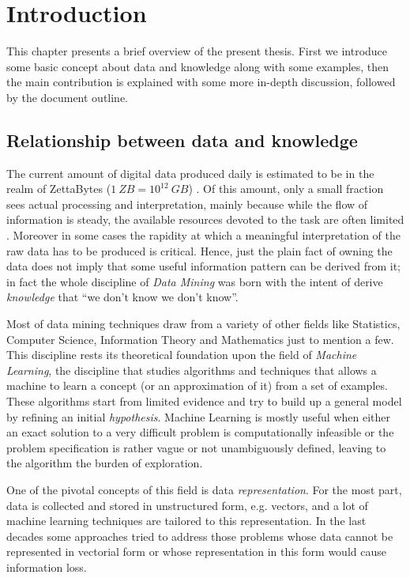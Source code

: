 
\chapter{Introduction} %
\label{Chapter1} %

This chapter presents a brief overview of the present thesis.
First we introduce some basic concept about data and knowledge along with some examples,
then the main contribution is explained with some more in-depth discussion,
followed by the document outline.

\section{Relationship between data and knowledge}

The current amount of digital data produced daily is estimated to be in the realm of 
ZettaBytes ($1~ZB = 10^{12}~GB$) \cite{idc}.
Of this amount, only a small fraction sees actual processing and interpretation,
mainly because while the flow of information is steady, the available resources
devoted to the task are often limited \cite{idc}.
Moreover in some cases the rapidity at which a meaningful interpretation of the 
raw data has to be produced is critical.
Hence, just the plain fact of owning the data does not imply that some useful 
information pattern can be derived from it; in fact the whole discipline of \emph{Data Mining}
was born with the intent of derive \emph{knowledge} that ``we don't know we don't know''.

Most of data mining techniques draw from a variety of other fields like Statistics,
Computer Science, Information Theory and Mathematics just to mention a few.
This discipline rests its theoretical foundation upon the field of \emph{Machine Learning},
the discipline that studies algorithms and techniques that allows a machine
to learn a concept (or an approximation of it) from a set of examples.
These algorithms start from limited evidence and try to build up a general model
by refining an initial \emph{hypothesis}.
Machine Learning is mostly useful when either an exact solution to a very
difficult problem is computationally infeasible or the problem specification
is rather vague or not unambiguously defined, leaving to the algorithm the burden
of exploration.

One of the pivotal concepts of this field is data \emph{representation}.
For the most part, data is collected and stored in unstructured form, e.g. vectors,
and a lot of machine learning techniques are tailored to this representation.
In the last decades some approaches tried to address those problems whose data cannot
be represented in vectorial form or whose representation in this form would cause
information loss.

